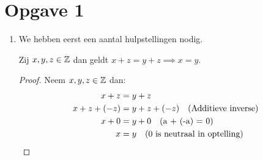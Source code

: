 \documentclass{article}
\begin{document}
\section*{Opgave 1}
\begin{enumerate}[label=\alph*)]
    \item We hebben eerst een aantal hulpstellingen nodig.
          \begin{lemma}[Schrapwet]\label{lem:schrapwet}
              Zij $x, y, z \in \mathbb{Z}$ dan geldt $x + z = y + z \implies x = y$.
              \begin{proof}
                  Neem $x, y, z \in \mathbb{Z}$ dan:
                  \begin{align*}
                      x + z        & = y + z                                       \\
                      x + z + (-z) & = y + z + (-z) \quad (\text{Additieve inverse}) \\
                      x + 0        & = y + 0 \quad (\text{a + (-a) = 0})             \\
                      x            & = y \quad (0 \text{ is neutraal in optelling})
                  \end{align*}
              \end{proof}


\end{lemma}
\end{enumerate}
\end{document}
